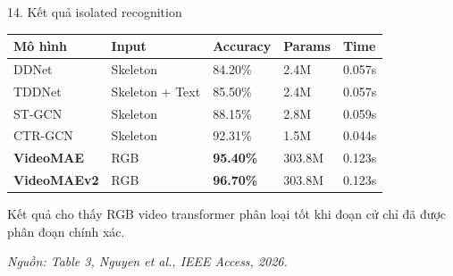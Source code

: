 \documentclass[aspectratio=169,9pt]{beamer}
\newcommand{\source}[1]{\vfill{\color{CoboGray}\fontsize{5.4}{6.4}\selectfont\itshape Nguồn: #1.\par}}
\begin{document}
\begin{frame}{14. Kết quả isolated recognition}
  \vspace{0.10cm}
  \centering
  {\fontsize{7.6}{9}\selectfont
  \renewcommand{\arraystretch}{1.16}
  \begin{tabular}{@{}L{2.10cm}L{2.35cm}R{1.45cm}R{1.42cm}R{1.42cm}@{}}
    \toprule
    \textbf{Mô hình} & \textbf{Input} & \textbf{Accuracy} & \textbf{Params} & \textbf{Time}\\
    \midrule
    DDNet & Skeleton & 84.20\% & 2.4M & 0.057s\\
    TDDNet & Skeleton + Text & 85.50\% & 2.4M & 0.057s\\
    ST-GCN & Skeleton & 88.15\% & 2.8M & 0.059s\\
    CTR-GCN & Skeleton & 92.31\% & 1.5M & 0.044s\\
    \textbf{VideoMAE} & RGB & \textbf{95.40\%} & 303.8M & 0.123s\\
    \textbf{VideoMAEv2} & RGB & \textbf{96.70\%} & 303.8M & 0.123s\\
    \bottomrule
  \end{tabular}}
  \vspace{0.40cm}
  \begin{tcolorbox}[cobobox,width=0.95\linewidth]
    Kết quả cho thấy RGB video transformer phân loại tốt khi đoạn cử chỉ đã được phân đoạn chính xác.
  \end{tcolorbox}
  \source{Table 3, Nguyen et al., IEEE Access, 2026}
\end{frame}
\end{document}
